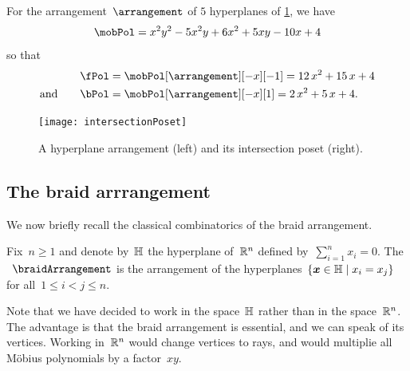 \begin{example}
For the arrangement~$\arrangement$ of $5$ hyperplanes of \cref{fig:arrangement}, we have
\[
\mobPol = x^2y^2 - 5x^2y + 6x^2 + 5xy - 10x + 4
\]
so that
\begin{align*}
\fPol & = \mobPol[\arrangement][-x][-1] = 12 \, x^2 + 15 \, x + 4 \\
\text{and}\qquad
\bPol & = \mobPol[\arrangement][-x][1] = 2 \, x^2 + 5 \, x + 4.
\end{align*}
%
\begin{figure}
	\texttt{[image: intersectionPoset]}
	\caption{A hyperplane arrangement (left) and its intersection poset (right).}
	\label{fig:arrangement}
\end{figure}
\end{example}

\subsection{The braid arrrangement}
\label{subsec:braidArrangement}

We now briefly recall the classical combinatorics of the braid arrangement.

\begin{definition}
Fix~$n \ge 1$ and denote by~$\mathbb{H}$ the hyperplane of~$\mathbb R^n$ defined by~$\sum_{i = 1}^n x_i = 0$.
The ~$\braidArrangement$ is the arrangement of the hyperplanes~$\left\{ \boldsymbol{x} \in \mathbb{H} \;\middle|\; x_i = x_j \right\}$ for all~$1 \le i < j \le n$.
\end{definition}

\begin{remark}
Note that we have decided to work in the space~$\mathbb{H}$ rather than in the space~$\mathbb R^n$.
The advantage is that the braid arrangement is essential, and we can speak of its vertices.
Working in~$\mathbb R^n$ would change vertices to rays, and would multiplie all M\"obius polynomials by a factor~$xy$.
\end{remark}

